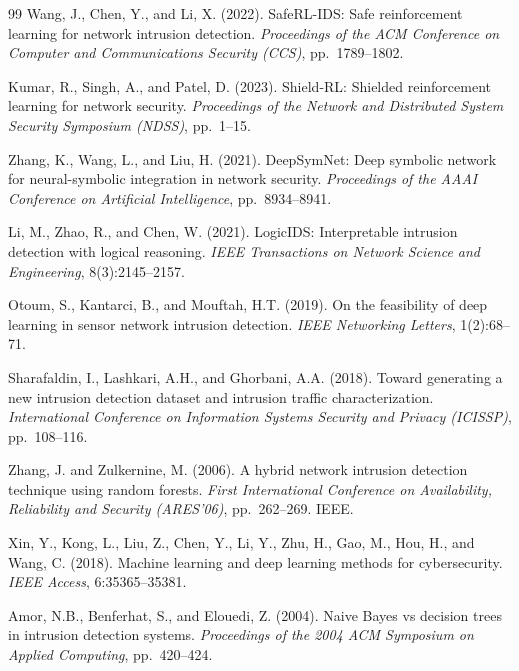 \documentclass[12pt, letterpaper, oneside]{report}
\begin{document}
\begin{thebibliography}{99}
Wang, J., Chen, Y., and Li, X. (2022).
SafeRL-IDS: Safe reinforcement learning for network intrusion detection.
\textit{Proceedings of the ACM Conference on Computer and Communications Security (CCS)}, pp.\ 1789--1802.

Kumar, R., Singh, A., and Patel, D. (2023).
Shield-RL: Shielded reinforcement learning for network security.
\textit{Proceedings of the Network and Distributed System Security Symposium (NDSS)}, pp.\ 1--15.

Zhang, K., Wang, L., and Liu, H. (2021).
DeepSymNet: Deep symbolic network for neural-symbolic integration in network security.
\textit{Proceedings of the AAAI Conference on Artificial Intelligence}, pp.\ 8934--8941.

Li, M., Zhao, R., and Chen, W. (2021).
LogicIDS: Interpretable intrusion detection with logical reasoning.
\textit{IEEE Transactions on Network Science and Engineering}, 8(3):2145--2157.

Otoum, S., Kantarci, B., and Mouftah, H.T. (2019).
On the feasibility of deep learning in sensor network intrusion detection.
\textit{IEEE Networking Letters}, 1(2):68--71.

Sharafaldin, I., Lashkari, A.H., and Ghorbani, A.A. (2018).
Toward generating a new intrusion detection dataset and intrusion traffic characterization.
\textit{International Conference on Information Systems Security and Privacy (ICISSP)}, pp.\ 108--116.

Zhang, J. and Zulkernine, M. (2006).
A hybrid network intrusion detection technique using random forests.
\textit{First International Conference on Availability, Reliability and Security (ARES'06)}, pp.\ 262--269. IEEE.

Xin, Y., Kong, L., Liu, Z., Chen, Y., Li, Y., Zhu, H., Gao, M., Hou, H., and Wang, C. (2018).
Machine learning and deep learning methods for cybersecurity.
\textit{IEEE Access}, 6:35365--35381.

Amor, N.B., Benferhat, S., and Elouedi, Z. (2004).
Naive Bayes vs decision trees in intrusion detection systems.
\textit{Proceedings of the 2004 ACM Symposium on Applied Computing}, pp.\ 420--424.


\end{thebibliography}
\end{document}
